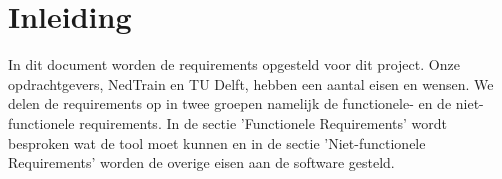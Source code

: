 \section{Inleiding}
In dit document worden de requirements opgesteld voor dit project. Onze opdrachtgevers, NedTrain en TU Delft, hebben een aantal eisen en wensen. We delen de requirements op in twee groepen namelijk de functionele- en de niet-functionele requirements. In de sectie 'Functionele Requirements' wordt besproken wat de tool moet kunnen en in de sectie 'Niet-functionele Requirements' worden de overige eisen aan de software gesteld. 
